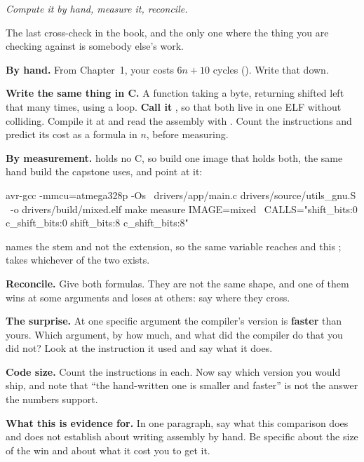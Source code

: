 \label{c6:ex:crosscheck}
\emph{Compute it by hand, measure it, reconcile.}

The last cross-check in the book, and the only one where the thing you are checking against is
somebody else's work.
\begin{parts}
  \item \textbf{By hand.} From Chapter~1, your  costs $6n + 10$ cycles
    (). Write that down.
  \item \textbf{Write the same thing in C.} A function taking a byte, returning  shifted
    left that many times, using a loop. \textbf{Call it }, so that both live in
    one ELF without colliding. Compile it at  and read the assembly with
    . Count the instructions and predict its cost as a formula in $n$, before
    measuring.
  \item \textbf{By measurement.}  holds no C, so build one image
    that holds both, the same hand build the capstone uses, and point  at it:
\begin{shell}
avr-gcc -mmcu=atmega328p -Os \
        drivers/app/main.c drivers/source/utils_gnu.S \
        -o drivers/build/mixed.elf
make measure IMAGE=mixed \
     CALLS="shift_bits:0 c_shift_bits:0 shift_bits:8 c_shift_bits:8"
\end{shell}
    \code{IMAGE} names the stem and not the extension, so the same variable reaches
    \file{drivers.hex} and this \file{mixed.elf};  takes whichever of the two
    exists.
  \item \textbf{Reconcile.} Give both formulas. They are not the same shape, and one of them wins
    at some arguments and loses at others: say where they cross.
  \item \textbf{The surprise.} At one specific argument the compiler's version is \textbf{faster}
    than yours. Which argument, by how much, and what did the compiler do that you did not? Look
    at the instruction it used and say what it does.
  \item \textbf{Code size.} Count the instructions in each. Now say which version you would ship,
    and note that ``the hand-written one is smaller and faster'' is not the answer the numbers
    support.
  \item \textbf{What this is evidence for.} In one paragraph, say what this comparison does and
    does not establish about writing assembly by hand. Be specific about the size of the win and
    about what it cost you to get it.
\end{parts}

